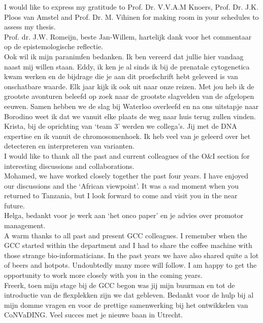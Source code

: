 \begin{appendices}
	\noindent I would like to express my gratitude to Prof. Dr. V.V.A.M Knoers, Prof. Dr. J.K. Ploos van Amstel and Prof. Dr. M. Vihinen for making room in your schedules to assess my thesis.\\ 
	
	\noindent Prof. dr. J.W. Romeijn, beste Jan-Willem, hartelijk dank voor het commentaar op de epistemologische reflectie.\\
	
	\noindent Ook wil ik mijn paranimfen bedanken. Ik ben vereerd dat jullie hier vandaag naast mij willen staan. Eddy, ik ken je al sinds ik bij de prenatale cytogenetica kwam werken en de bijdrage die je aan dit proefschrift hebt geleverd is van onschatbare waarde. Elk jaar kijk ik ook uit naar onze reizen. Met jou heb ik de grootste avonturen beleefd op zoek naar de grootste slagvelden van de afgelopen eeuwen. Samen hebben we de slag bij Waterloo overleefd en na ons uitstapje naar Borodino weet ik dat we vanuit elke plaats de weg naar huis terug zullen vinden. Krista, bij de oprichting van ‘team 3’ werden we collega’s. Jij met de DNA expertise en ik vanuit de chromosomenhoek. Ik heb veel van je geleerd over het detecteren en interpreteren van varianten.\\ 
	
	\noindent I would like to thank all the past and current colleagues of the O\&I section for interesting discussions and collaborations.\\ 
	
	\noindent Mohamed, we have worked closely together the past four years. I have enjoyed our discussions and the ‘African viewpoint’. It was a sad moment when you returned to Tanzania, but I look forward to come and visit you in the near future.\\
	
	\noindent Helga, bedankt voor je werk aan ‘het onco paper’ en je advies over promotor management.\\
	
	\noindent A warm thanks to all past and present GCC colleagues. I remember when the GCC started within the department and I had to share the coffee machine with those strange bio-informaticians. In the past years we have also shared quite a lot of beers and hotpots. Undoubtedly many more will follow. I am happy to get the opportunity to work more closely with you in the coming years.\\
	
	\noindent Freerk, toen mijn stage bij de GCC begon was jij mijn buurman en tot de introductie van de flexplekken zijn we dat gebleven. Bedankt voor de hulp bij al mijn domme vragen en voor de prettige samenwerking bij het ontwikkelen van CoNVaDING. Veel succes met je nieuwe baan in Utrecht.\\
	

\end{appendices}
